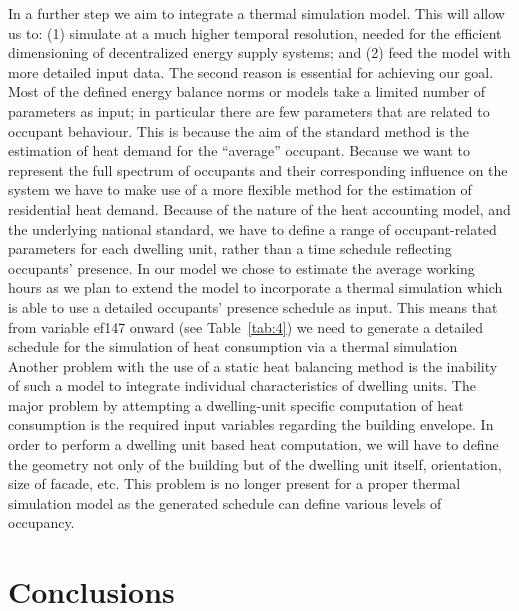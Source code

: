 \documentclass[11pt]{IJM-article}
\begin{document}
In a further step we aim to integrate a thermal simulation model. This will
allow us to: (1) simulate at a much higher temporal resolution, needed for the
efficient dimensioning of decentralized energy supply systems; and (2) feed the
model with more detailed input data. The second reason is essential for
achieving our goal. Most of the defined energy balance norms or models take a
limited number of parameters as input; in particular there are few parameters
that are related to occupant behaviour. This is because the aim of the standard
method is the estimation of heat demand for the ``average'' occupant. Because
we want to represent the full spectrum of occupants and their corresponding
influence on the system we have to make use of a more flexible method for the
estimation of residential heat demand.  Because of the nature of the heat
accounting model, and the underlying national standard, we have to define a
range of occupant-related parameters for each dwelling unit, rather than a time
schedule reflecting occupants' presence. In our model we chose to estimate the
average working hours as we plan to extend the model to incorporate a thermal
simulation which is able to use a detailed occupants’ presence schedule as
input. This means that from variable ef147 onward (see Table~\ref{tab:4}) we
need to generate a detailed schedule for the simulation of heat consumption via
a thermal simulation   Another problem with the
use of a static heat balancing method is the inability of such a model to
integrate individual characteristics of dwelling units. The major problem by
attempting a dwelling-unit specific computation of heat consumption is the
required input variables regarding the building envelope. In order to perform a
dwelling unit based heat computation, we will have to define the geometry not
only of the building but of the dwelling unit itself, orientation, size of
facade, etc. This problem is no longer present for a proper thermal simulation
model as the generated schedule can define various levels of occupancy.\\

\section{Conclusions}\label{sec:10}
\end{document}
